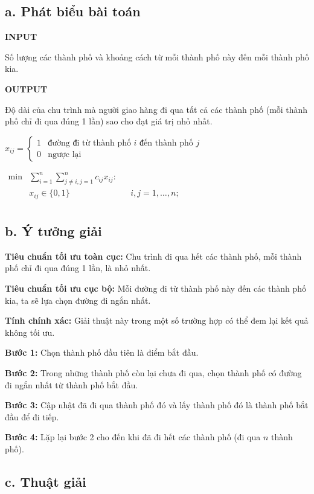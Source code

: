 \documentclass[12pt, a4paper, fleqn]{article}
\begin{document}
	\subsection*{a. Phát biểu bài toán}
	
	\textbf{INPUT}
	
	Số lượng các thành phố và khoảng cách từ mỗi thành phố này đến mỗi thành phố kia.
	
	\textbf{OUTPUT}
	
	Độ dài của chu trình mà người giao hàng đi qua tất cả các thành phố (mỗi thành phố chỉ đi qua đúng 1 lần) sao cho đạt giá trị nhỏ nhất.
	
	$x_{ij}= {
		\begin{cases}
		1 & {\text{đường đi từ thành phố } i {\text{ đến thành phố }} j} \\
		0 & {\text{ngược lại}}
		\end{cases}
	}$
	
	${\displaystyle
		{\begin{aligned}
			\min &\sum _{i=1}^{n}\sum _{j\neq i,j=1}^{n}c_{ij}x_{ij}\colon &&\\
			&x_{ij}\in \{0,1\}&&i,j=1,\ldots ,n;\\
			\end{aligned}}}$
	
	\subsection*{b. Ý tưởng giải}
	
	\textbf{Tiêu chuẩn tối ưu toàn cục:} Chu trình đi qua hết các thành phố, mỗi thành phố chỉ đi qua đúng 1 lần, là nhỏ nhất.
	
	\textbf{Tiêu chuẩn tối ưu cục bộ:} Mỗi đường đi từ thành phố này đến các thành phố kia, ta sẽ lựa chọn đường đi ngắn nhất.
	
	\textbf{Tính chính xác:} Giải thuật này trong một số trường hợp có thể đem lại kết quả không tối ưu.
	
	\textbf{Bước 1:} Chọn thành phố đầu tiên là điểm bắt đầu.
	
	\textbf{Bước 2:} Trong những thành phố còn lại chưa đi qua, chọn thành phố có đường đi ngắn nhất từ thành phố bắt đầu.
	
	\textbf{Bước 3:} Cập nhật đã đi qua thành phố đó và lấy thành phố đó là thành phố bắt đầu để đi tiếp.
	
	\textbf{Bước 4:} Lặp lại bước 2 cho đến khi đã đi hết các thành phố (đi qua $n$ thành phố).
	
	\subsection*{c. Thuật giải}
	
\end{document}
